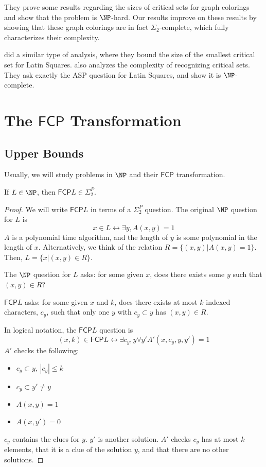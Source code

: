 \documentclass[runningheads,a4paper]{llncs}
\begin{document}
They prove some results regarding the sizes of critical sets for graph colorings and show that the problem is $\NP$-hard. Our results improve on these results by showing that these graph colorings are in fact $\Sigma_2$-complete, which fully characterizes their complexity.

\cite{Ghandehari2005121} did a similar type of analysis, where they bound the size of the smallest critical set for Latin Squares. \cite{colbourn1984computational} also analyzes the complexity of recognizing critical sets. They ask exactly the ASP question for Latin Squares, and show it is $\NP$-complete.


\section{The $\mathsf{FCP}$ Transformation}
\label{sec:prelim}

\subsection{Upper Bounds}

Usually, we will study problems in $\NP$ and their $\mathsf{FCP}$ transformation.

\begin{theorem}
\label{thm:satinsig2}
If $L \in \NP$, then $\mathsf{FCP} L \in \Sigma_2^P$. 
\end{theorem}

\begin{proof}
We will write $\mathsf{FCP} L$ in terms of a $\Sigma_2^P$ question. The original $\NP$ question for $L$ is
\[ x \in L \leftrightarrow \exists y, A(x, y) = 1 \]
$A$ is a polynomial time algorithm, and the length of $y$ is some polynomial in the length of $x$. Alternatively, we think of the relation $R = \{ (x, y) | A(x,y) = 1 \}$. Then, $L = \{ x | (x,y) \in R \}$. 

The $\NP$ question for $L$ asks: for some given $x$, does there exists some $y$ such that $(x, y) \in R$?

$\mathsf{FCP} L$ asks: for some given $x$ and $k$, does there exists at most $k$ indexed characters, $c_y$, such that only one $y$ with $c_y \subset y$ has $(x,y) \in R$. 

In logical notation, the $\mathsf{FCP} L$ question is
\[ (x, k) \in \mathsf{FCP} L \leftrightarrow \exists c_y, y \forall y' A'(x, c_y, y, y') = 1 \]
$A'$ checks the following:
\begin{itemize}
\item $c_y \subset y$, $|c_y| \leq k$
\item $c_y \subset y' \neq y$ 
\item $A(x,y) = 1$
\item $A(x, y') = 0$ 
\end{itemize}
$c_y$ contains the clues for $y$. $y'$ is another solution. $A'$ checks $c_y$ has at most $k$ elements, that it is a clue of the solution $y$, and that there are no other solutions.
\end{proof}
\end{document}
